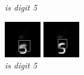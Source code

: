 \documentclass{article} %
\begin{document}
\begin{figure}[t]
  \caption{\textit{is digit 5}}
\endminipage\hfill
{}
  \includegraphics[width=\linewidth]{figures/5-7-9.png}
  \caption{\textit{is digit 5}}
\endminipage\hfill
{}
  \includegraphics[width=\linewidth]{figures/5-7-13.png}

\end{figure}
\end{document}
